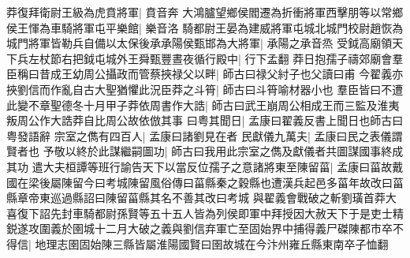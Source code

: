 莽復拜衛尉王級為虎賁將軍|{
	賁音奔}
大鴻臚望鄉侯閻遷為折衝將軍西擊朋等以常鄉侯王惲為車騎將軍屯平樂館|{
	樂音洛}
騎都尉王晏為建威將軍屯城北城門校尉趙恢為城門將軍皆勒兵自備以太保後承承陽侯甄邯為大將軍|{
	承陽之承音烝}
受鉞高廟領天下兵左杖節右把鉞屯城外王舜甄豐晝夜循行殿中|{
	行下孟翻}
莽日抱孺子禱郊廟會羣臣稱曰昔成王幼周公攝政而管蔡挾禄父以畔|{
	師古曰禄父紂子也父讀曰甫}
今翟義亦挾劉信而作亂自古大聖猶懼此況臣莽之斗筲|{
	師古曰斗筲喻材器小也}
羣臣皆曰不遭此變不章聖德冬十月甲子莽依周書作大誥|{
	師古曰武王崩周公相成王而三監及淮夷叛周公作大誥莽自比周公故依倣其事}
曰粤其聞日|{
	孟康曰翟義反書上聞日也師古曰粤發語辭}
宗室之儁有四百人|{
	孟康曰諸劉見在者}
民獻儀九萬夫|{
	孟康曰民之表儀謂賢者也}
予敬以終於此謀繼嗣圖功|{
	師古曰我用此宗室之儁及獻儀者共圖謀國事終成其功}
遣大夫桓譚等班行諭告天下以當反位孺子之意諸將東至陳留菑|{
	孟康曰菑故戴國在梁後屬陳留今曰考城陳留風俗傳曰菑縣秦之穀縣也遭漢兵起邑多菑年故改曰菑縣章帝東巡過縣詔曰陳留菑縣其名不善其改曰考城}
與翟義會戰破之斬劉璜首莽大喜復下詔先封車騎都尉孫賢等五十五人皆為列侯即軍中拜授因大赦天下于是吏士精鋭遂攻圍義於圉城十二月大破之義與劉信弃軍亡至固始界中捕得義尸磔陳都市卒不得信|{
	地理志圉固始陳三縣皆屬淮陽國賢曰圉故城在今汴州雍丘縣東南卒子恤翻}


